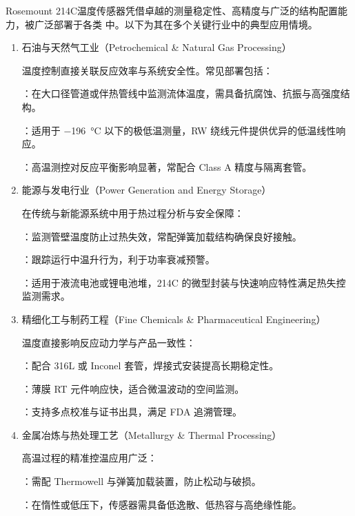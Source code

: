 Rosemount 214C温度传感器凭借卓越的测量稳定性、高精度与广泛的结构配置能力，被广泛部署于各类  中。以下为其在多个关键行业中的典型应用情境。
\begin{enumerate}
	\item 石油与天然气工业（Petrochemical \& Natural Gas Processing）
	
	温度控制直接关联反应效率与系统安全性。常见部署包括：
	
	：在大口径管道或伴热管线中监测流体温度，需具备抗腐蚀、抗振与高强度结构。
	
	：适用于 \SI{-196}{\degreeCelsius} 以下的极低温测量，RW 绕线元件提供优异的低温线性响应。
	
	：高温测控对反应平衡影响显著，常配合 Class A 精度与隔离套管。
	
	\item 能源与发电行业（Power Generation and Energy Storage）
	
	在传统与新能源系统中用于热过程分析与安全保障：
	
	：监测管壁温度防止过热失效，常配弹簧加载结构确保良好接触。
	
	：跟踪运行中温升行为，利于功率衰减预警。
	
	：适用于液流电池或锂电池堆，214C 的微型封装与快速响应特性满足热失控监测需求。
	
	\item 精细化工与制药工程（Fine Chemicals \& Pharmaceutical Engineering）
	
	温度直接影响反应动力学与产品一致性：
	
	：配合 316L 或 Inconel 套管，焊接式安装提高长期稳定性。
	
	：薄膜 RT 元件响应快，适合微温波动的空间监测。
	
	：支持多点校准与证书出具，满足 FDA 追溯管理。
	
	\item 金属冶炼与热处理工艺（Metallurgy \& Thermal Processing）
	
	高温过程的精准控温应用广泛：
	
	：需配 Thermowell 与弹簧加载装置，防止松动与破损。
	
	：在惰性或低压下，传感器需具备低逸散、低热容与高绝缘性能。
	

\end{enumerate}
